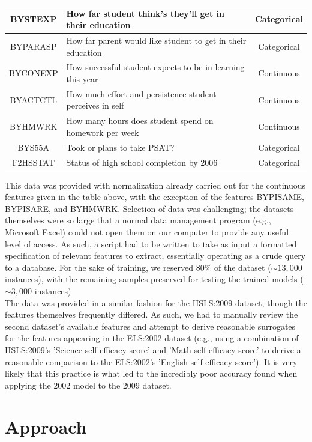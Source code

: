 \documentclass[conference]{IEEEtran}
\begin{document}
\begin{center}
\begin{tabular}{| c | p{1.5in} | c |}
\hline
BYSTEXP & How far student think's they'll get in their education & Categorical\\
\hline
BYPARASP & How far parent would like student to get in their education & Categorical\\
\hline
BYCONEXP & How successful student expects to be in learning this year & Continuous\\
\hline
BYACTCTL & How much effort and persistence student perceives in self & Continuous\\
\hline
BYHMWRK & How many hours does student spend on homework per week & Continuous\\
\hline
BYS55A & Took or plans to take PSAT? & Categorical\\
\hline
F2HSSTAT & Status of high school completion by 2006 & Categorical\\
\hline
\end{tabular}
\end{center}

This data was provided with normalization already carried out for the continuous features given in the table above,
with the exception of the features BYPISAME, BYPISARE, and BYHMWRK. Selection of data was challenging; the
datasets themselves were so large that a normal data management program (e.g., Microsoft Excel) could not open
them on our computer to provide any useful level of access. As such, a script had to be written to take as input a formatted
specification of relevant features to extract, essentially operating as a crude query to a database. For the sake of training, we
reserved $80\%$ of the dataset ($\sim 13,000$ instances), with the remaining samples preserved for testing the trained models 
($\sim 3,000$ instances)\\

The data was provided in a similar fashion for the HSLS:2009 dataset, though the features themselves frequently differed. As 
such, we had to manually review the second dataset's available features and attempt to derive reasonable surrogates for the
features appearing in the ELS:2002 dataset (e.g., using a combination of HSLS:2009's 'Science self-efficacy score' and 'Math
self-efficacy score' to derive a reasonable comparison to the ELS:2002's 'English self-efficacy score'). It is very likely that this
practice is what led to the incredibly poor accuracy found when applying the 2002 model to the 2009 dataset.\\

\section{Approach}
\end{document}
